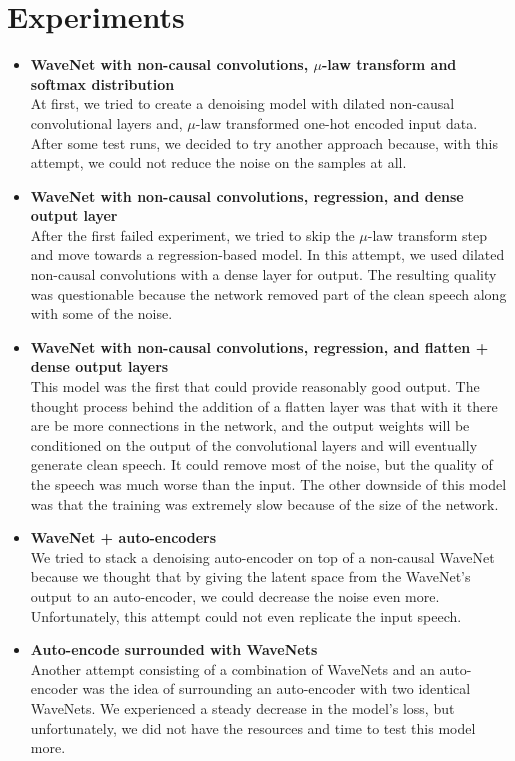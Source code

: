 \documentclass{article}
\begin{document}
	\section{Experiments}
	\begin{itemize}
	\item \textbf{WaveNet with non-causal convolutions, \boldmath$\mu$-law transform and softmax distribution} \\
	At first, we tried to create a denoising model with dilated non-causal convolutional layers and, $\mu$-law transformed one-hot encoded input data. After some test runs, we decided to try another approach because, with this attempt, we could not reduce the noise on the samples at all.
	\item \textbf{WaveNet with non-causal convolutions, regression, and dense output layer} \\
	After the first failed experiment, we tried to skip the $\mu$-law transform step and move towards a regression-based model. In this attempt, we used dilated non-causal convolutions with a dense layer for output. The resulting quality was questionable because the network removed part of the clean speech along with some of the noise.
	\item \textbf{WaveNet with non-causal convolutions, regression, and flatten + dense output layers} \\
	This model was the first that could provide reasonably good output. The thought process behind the addition of a flatten layer was that with it there are be more connections in the network, and the output weights will be conditioned on the output of the convolutional layers and will eventually generate clean speech. It could remove most of the noise, but the quality of the speech was much worse than the input. The other downside of this model was that the training was extremely slow because of the size of the network.
	\item \textbf{WaveNet + auto-encoders} \\
	We tried to stack a denoising auto-encoder on top of a non-causal WaveNet because we thought that by giving the latent space from the WaveNet's output to an auto-encoder, we could decrease the noise even more. Unfortunately, this attempt could not even replicate the input speech.
	\item \textbf {Auto-encode surrounded with WaveNets} \\
	Another attempt consisting of a combination of WaveNets and an auto-encoder was the idea of surrounding an auto-encoder with two identical WaveNets. We experienced a steady decrease in the model's loss, but unfortunately, we did not have the resources and time to test this model more.

\end{itemize}
\end{document}
